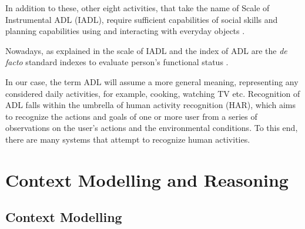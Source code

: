 \documentclass{thesisreport}
\begin{document}
 In addition to these, other eight activities, that take the name of Scale of Instrumental ADL \cite{lawton1970assessment} (IADL), require sufficient capabilities of social skills and planning capabilities using and interacting with everyday objects \cite{buoncompagni2017towards}. 




Nowadays, as explained in \cite{bruno2014public} the scale of IADL and the index of ADL are the \textit{de facto} standard indexes to evaluate person’s functional status \cite{buoncompagni2017towards}. 

In our case, the term ADL will assume a more general meaning, representing any  considered daily activities, for example, cooking, watching TV etc.
Recognition of ADL falls within the umbrella of human activity recognition (HAR), which aims to recognize the actions and goals of one or more user from a series of observations on the user's actions and the environmental conditions. To this end, there are many systems that attempt to recognize human activities. %


\section{Context Modelling and Reasoning}
\subsection{Context Modelling}
\end{document}
